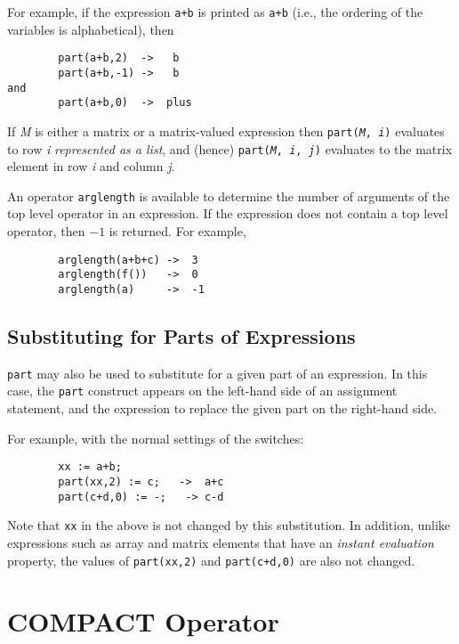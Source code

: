 For example, if the expression \texttt{a+b} is printed as \texttt{a+b} (i.e.,
the ordering of the variables is alphabetical), then
\begin{verbatim}
        part(a+b,2)  ->   b
        part(a+b,-1) ->   b
and
        part(a+b,0)  ->  plus
\end{verbatim}

If \emph{M} is either a matrix or a matrix-valued expression then
\texttt{part(\emph{M}, \emph{i})} evaluates to row \emph{i}
\emph{represented as a list}, and (hence) \texttt{part(\emph{M},
  \emph{i}, \emph{j})} evaluates to the matrix element in row \emph{i}
and column \emph{j}.

\hypertarget{operator:ARGLENGTH}{}
An operator \texttt{arglength} is available to determine
the number of arguments of the top level operator in an expression.  If
the expression does not contain a top level operator, then $-1$ is returned.
For example,
\begin{verbatim}
        arglength(a+b+c) ->  3
        arglength(f())   ->  0
        arglength(a)     ->  -1
\end{verbatim}

\subsection{Substituting for Parts of Expressions}

\texttt{part} may also be used to substitute for a given part of an
expression.  In this case, the \texttt{part} construct appears on the
left-hand side of an assignment statement, and the expression to replace
the given part on the right-hand side.

For example, with the normal settings of the {\REDUCE} switches:
\begin{verbatim}
        xx := a+b;
        part(xx,2) := c;   ->  a+c
        part(c+d,0) := -;   -> c-d
\end{verbatim}

Note that \texttt{xx} in the above is not changed by this substitution.  In
addition, unlike expressions such as array and matrix elements that have
an \emph{instant evaluation\/} property, the values
of \texttt{part(xx,2)} and \texttt{part(c+d,0)} are also not changed.


\section{COMPACT Operator}
\label{sec:COMPACT}

